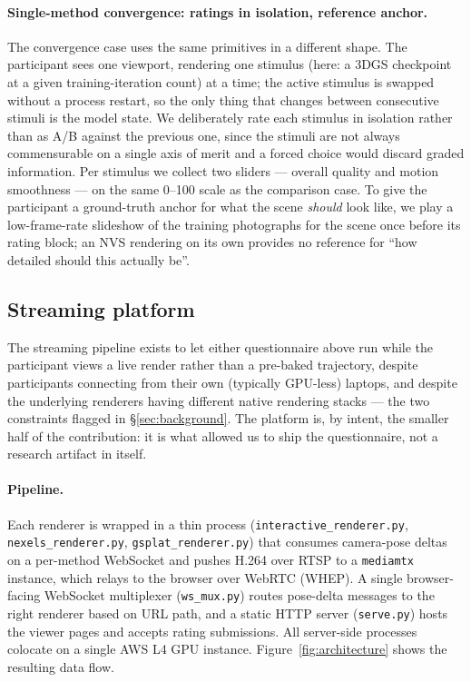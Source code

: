 \paragraph{Single-method convergence: ratings in isolation, reference
anchor.}
The convergence case uses the same primitives in a different shape. The
participant sees one viewport, rendering one stimulus (here: a 3DGS
checkpoint at a given training-iteration count) at a time; the active
stimulus is swapped without a process restart, so the only thing that
changes between consecutive stimuli is the model state. We deliberately
rate each stimulus in isolation rather than as A/B against the previous
one, since the stimuli are not always commensurable on a single axis of
merit and a forced choice would discard graded information. Per
stimulus we collect two sliders --- overall quality and motion
smoothness --- on the same 0--100 scale as the comparison case. To
give the participant a ground-truth anchor for what the scene
\emph{should} look like, we play a low-frame-rate slideshow of the
training photographs for the scene once before its rating block; an
NVS rendering on its own provides no reference for ``how detailed
should this actually be''.

\subsection{Streaming platform}
\label{sec:platform}

The streaming pipeline exists to let either questionnaire above run
while the participant views a live render rather than a pre-baked
trajectory, despite participants connecting from their own
(typically GPU-less) laptops, and despite the underlying renderers
having different native rendering stacks --- the two constraints
flagged in \S\ref{sec:background}. The platform is, by intent, the
smaller half of the contribution: it is what allowed us to ship the
questionnaire, not a research artifact in itself.

\paragraph{Pipeline.}
Each renderer is wrapped in a thin process
(\texttt{interactive\_renderer.py},
\texttt{nexels\_renderer.py}, \texttt{gsplat\_renderer.py}) that
consumes camera-pose deltas on a per-method WebSocket and pushes H.264
over RTSP to a \texttt{mediamtx} instance, which relays to the browser
over WebRTC (WHEP). A single browser-facing WebSocket multiplexer
(\texttt{ws\_mux.py}) routes pose-delta messages to the right renderer
based on URL path, and a static HTTP server (\texttt{serve.py}) hosts
the viewer pages and accepts rating submissions. All server-side
processes colocate on a single AWS L4 GPU instance.
Figure~\ref{fig:architecture} shows the resulting data flow.

